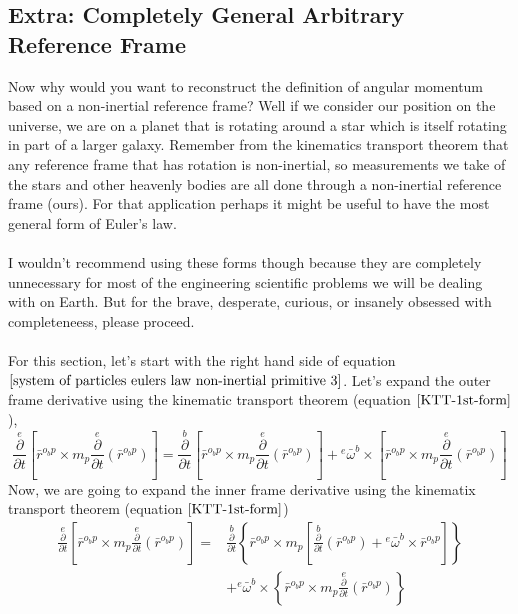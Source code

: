 \subsection{Extra: Completely General Arbitrary Reference Frame}
\label{General Rotation Case Section}
\begin{comment}
THERE IS SOMETHING DEEPLY WRONG!!! FIRSTLY WE NEVE ENTERERD PROOF, AND SECONDLY w x (r x (w x r)) is not always necessarily zero!!!
\end{comment}
Now why would you want to reconstruct the definition of angular momentum based on a non-inertial reference frame?
Well if we consider our position on the universe, we are on a planet that is rotating around a star which is itself rotating in part of a larger galaxy.
Remember from the kinematics transport theorem that any reference frame that has rotation is non-inertial, so measurements we take of the stars and other heavenly bodies are all done through a non-inertial reference frame (ours).
For that application perhaps it might be useful to have the most general form of Euler's law.
\\~\\I wouldn't recommend using these forms though because they are completely unnecessary for most of the engineering scientific problems we will be dealing with on Earth.
But for the brave, desperate, curious, or insanely obsessed with completeneess, please proceed.
\\~\\For this section, let's start with the right hand side of equation $\ref{system of particles eulers law non-inertial primitive 3}$.
Let's expand the outer frame derivative using the kinematic transport theorem (equation $\ref{KTT-1st-form}$),
$$\overset{e}{\frac{\partial}{\partial t}}\left[\bar{r}^{o_{b}p}\times m_{p}\overset{e}{\frac{\partial}{\partial t}}(\bar{r}^{o_{b}p})\right] = 
\overset{b}{\frac{\partial}{\partial t}}\left[\bar{r}^{o_{b}p}\times m_{p}\overset{e}{\frac{\partial}{\partial t}}(\bar{r}^{o_{b}p})\right] 
+ {}^{e}\bar{\omega}^{b}\times\left[\bar{r}^{o_{b}p}\times m_{p}\overset{e}{\frac{\partial}{\partial t}}(\bar{r}^{o_{b}p})\right]$$
Now, we are going to expand the inner frame derivative using the kinematix transport theorem (equation $\ref{KTT-1st-form}$)
\begin{align*}
\overset{e}{\frac{\partial}{\partial t}}\left[\bar{r}^{o_{b}p}\times m_{p}\overset{e}{\frac{\partial}{\partial t}}(\bar{r}^{o_{b}p})\right] = &
\overset{b}{\frac{\partial}{\partial t}}\left\{\bar{r}^{o_{b}p}\times m_{p}\left[
\overset{b}{\frac{\partial}{\partial t}}(\bar{r}^{o_{b}p}) + {}^{e}\bar{\omega}^{b}\times\bar{r}^{o_{b}p}
\right]\right\} 
\\ & + {}^{e}\bar{\omega}^{b}\times\left\{\bar{r}^{o_{b}p}\times m_{p}\overset{e}{\frac{\partial}{\partial t}}(\bar{r}^{o_{b}p})\right\}
\end{align*}
